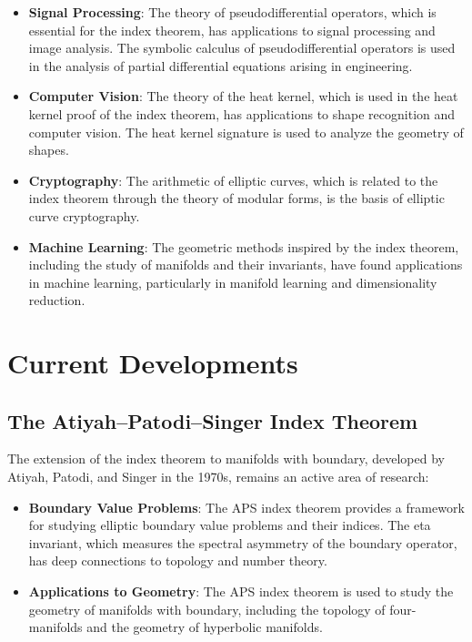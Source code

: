 \begin{itemize}
\item \textbf{Signal Processing}: The theory of pseudodifferential operators, which is essential for the index theorem, has applications to signal processing and image analysis. The symbolic calculus of pseudodifferential operators is used in the analysis of partial differential equations arising in engineering.

\item \textbf{Computer Vision}: The theory of the heat kernel, which is used in the heat kernel proof of the index theorem, has applications to shape recognition and computer vision. The heat kernel signature is used to analyze the geometry of shapes.

\item \textbf{Cryptography}: The arithmetic of elliptic curves, which is related to the index theorem through the theory of modular forms, is the basis of elliptic curve cryptography.

\item \textbf{Machine Learning}: The geometric methods inspired by the index theorem, including the study of manifolds and their invariants, have found applications in machine learning, particularly in manifold learning and dimensionality reduction.
\end{itemize}

\section{Current Developments}

\subsection{The Atiyah--Patodi--Singer Index Theorem}

The extension of the index theorem to manifolds with boundary, developed by Atiyah, Patodi, and Singer in the 1970s, remains an active area of research:

\begin{itemize}
\item \textbf{Boundary Value Problems}: The APS index theorem provides a framework for studying elliptic boundary value problems and their indices. The eta invariant, which measures the spectral asymmetry of the boundary operator, has deep connections to topology and number theory.

\item \textbf{Applications to Geometry}: The APS index theorem is used to study the geometry of manifolds with boundary, including the topology of four-manifolds and the geometry of hyperbolic manifolds.
\end{itemize}


